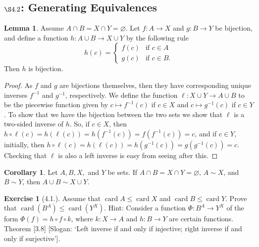 \documentclass[9pt,reqno]{amsart}
\theoremstyle{definition}
\newtheorem{lemma}{Lemma}[section]
\newtheorem{exercise}{Exercise}[section]
\newtheorem{coro}{Corollary}[section]
\DeclareMathOperator{\card}{card}
\begin{document}
\subsection{$\S 4.2$: Generating Equivalences}
\begin{lemma}
	Assume $A \cap B = X \cap Y = \varnothing$. Let $f \colon A \to X$ and $g \colon B \to Y$ be bijection, and define a function $h \colon A \cup B \to X \cup Y$ by the following rule 
	\[
	h(c) = \begin{cases}
		f(c) & \text{if }c \in A  \\ 
		g(c) & \text{if } c \in B.
	\end{cases}
	\] Then $h$ is bijection.
\end{lemma}
\begin{proof}
	As $f$ and $g$ are bijections themselves, then they have corresponding unique inverses $f^{-1}$ and $g^{-1}$, respectively. We define the function $\ell \colon X \cup Y \to A \cup B$ to be the piecewise function given by $c \mapsto f^{-1}(c)$ if $c \in X$ and $c \mapsto g^{-1}(c)$ if $c \in Y$. To show that we have the bijection between the two sets we show that $\ell$ is a two-sided inverse of $h$. So, if $c \in X$, then $h \circ \ell (c) = h(\ell (c)) = h(f^{-1}(c)) = f(f^{-1}(c)) = c$, and if $c \in Y$, initially, then $h \circ \ell (c) = h(\ell (c)) = h (g^{-1}(c)) = g(g^{-1}(c)) = c$. Checking that $\ell$ is also a left inverse is easy from seeing after this. 
\end{proof}
\begin{coro} Let $A,B, X,$ and $Y$ be sets. If $A \cap B = X \cap Y = \varnothing$,  $A \sim X$, and $B \sim Y$, then $A \cup B \sim X \cup Y$.
\end{coro}
\begin{exercise}[4.1.]
	Assume that $\card A \leq \card X$ and $\card B \leq \card Y$. Prove that $\card (B^A) \leq \card (Y^X)$. Hint: Consider a function $\Phi \colon B^A \to Y^X$ of the form $\Phi (f) = h \circ f \circ k$, where $k \colon X \to A$ and $h \colon B \to Y$ are certain functions. Theorem [3.8] [Slogan: `Left inverse if and only if injective; right inverse if and only if surjective'].
\end{exercise}
\end{document}
